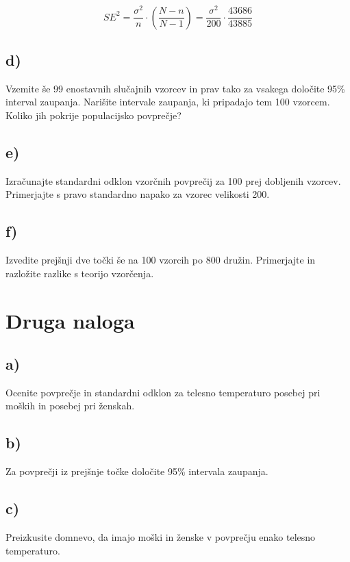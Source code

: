 \documentclass[12pt, a4paper]{article}
\begin{document}
$$ SE^2 = \frac{\sigma^2}{n} \cdot (\frac{N-n}{N-1}) = \frac{\sigma^2}{200} \cdot \frac{43686}{43885}
$$

\subsection{d)}
Vzemite še 99 enostavnih slučajnih vzorcev in prav tako za vsakega določite
95\% interval zaupanja. Narišite intervale zaupanja, ki pripadajo tem 100 
vzorcem. Koliko jih pokrije populacijsko povprečje?

\subsection{e)}
Izračunajte standardni odklon vzorčnih povprečij za 100 prej dobljenih 
vzorcev. Primerjajte s pravo standardno napako za vzorec velikosti 200.

\subsection{f)}
Izvedite prejšnji dve točki še na 100 vzorcih po 800 družin. Primerjajte 
in razložite razlike s teorijo vzorčenja.



\section{Druga naloga}

\subsection{a)}
Ocenite povprečje in standardni odklon za telesno temperaturo posebej pri
moških in posebej pri ženskah.

\subsection{b)}
Za povprečji iz prejšnje točke določite 95\% intervala zaupanja.

\subsection{c)}
Preizkusite domnevo, da imajo moški in ženske v povprečju enako telesno 
temperaturo.


\end{document}
